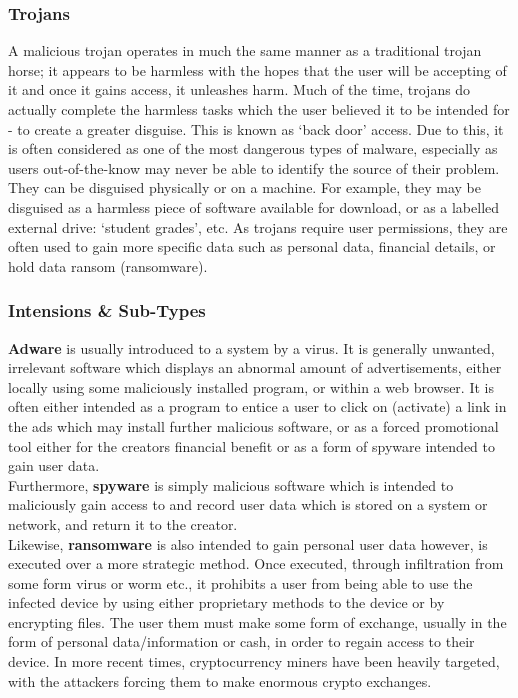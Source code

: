 \documentclass[11pt, english]{article}
\begin{document}
		\subsubsection{Trojans}

	A malicious trojan operates in much the same manner as a traditional trojan horse; it appears to be harmless with the hopes that the user will be accepting of it and once it gains access, it unleashes harm. Much of the time, trojans do actually complete the harmless tasks which the user believed it to be intended for - to create a greater disguise. This is known as `back door' access. Due to this, it is often considered as one of the most dangerous types of malware, especially as users out-of-the-know may never be able to identify the source of their problem. They can be disguised physically or on a machine. For example, they may be disguised as a harmless piece of software available for download, or as a labelled external drive: `student grades', etc. As trojans require user permissions, they are often used to gain more specific data such as personal data, financial details, or hold data ransom (ransomware).

		\subsubsection{Intensions \& Sub-Types}

	\textbf{Adware} is usually introduced to a system by a virus. It is generally unwanted, irrelevant software which displays an abnormal amount of advertisements, either locally using some maliciously installed program, or within a web browser. It is often either intended as a program to entice a user to click on (activate) a link in the ads which may install further malicious software, or as a forced promotional tool either for the creators financial benefit or as a form of spyware intended to gain user data.\\

	Furthermore, \textbf{spyware} is simply malicious software which is intended to maliciously gain access to and record user data which is stored on a system or network, and return it to the creator.\\

	Likewise, \textbf{ransomware} is also intended to gain personal user data however, is executed over a more strategic method. Once executed, through infiltration from some form virus or worm etc., it prohibits a user from being able to use the infected device by using either proprietary methods to the device or by encrypting files. The user them must make some form of exchange, usually in the form of personal data/information or cash, in order to regain access to their device. In more recent times, cryptocurrency miners have been heavily targeted, with the attackers forcing them to make enormous crypto exchanges.\\
\end{document}

